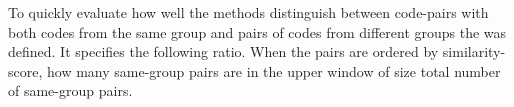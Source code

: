 \documentclass[../main.tex]{subfiles}
\begin{document}
To quickly evaluate how well the methods distinguish between code-pairs with both codes from the same group and pairs of codes from different groups the  was defined.
It specifies the following ratio.
When the pairs are ordered by similarity-score, how many same-group pairs are in the upper window of size total number of same-group pairs.
\end{document}
